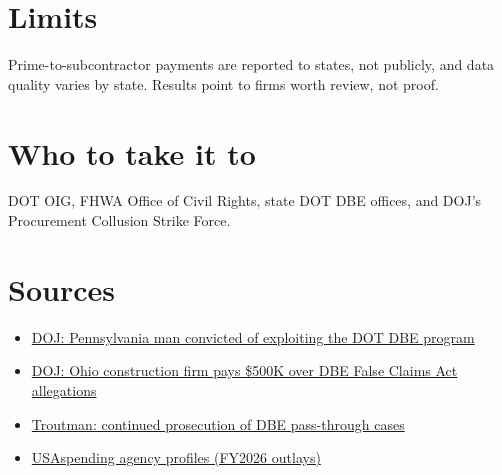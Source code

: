 \documentclass[letterpaper,11pt]{article}
\providecommand{\tightlist}{\setlength{\itemsep}{0pt}\setlength{\parskip}{0pt}}
\begin{document}
\hypertarget{limits}{%
\section{Limits}\label{limits}}

Prime-to-subcontractor payments are reported to states, not publicly,
and data quality varies by state. Results point to firms worth review,
not proof.

\hypertarget{who-to-take-it-to}{%
\section{Who to take it to}\label{who-to-take-it-to}}

DOT OIG, FHWA Office of Civil Rights, state DOT DBE offices, and DOJ's
Procurement Collusion Strike Force.

\hypertarget{sources}{%
\section{Sources}\label{sources}}

\begin{itemize}
\tightlist
\item
  \href{https://www.justice.gov/usao-edpa/pr/downingtown-man-convicted-exploiting-usdot-disadvantaged-business-program}{DOJ:
  Pennsylvania man convicted of exploiting the DOT DBE program}
\item
  \href{https://www.justice.gov/opa/pr/ohio-construction-firm-agrees-pay-500000-resolve-false-claims-act-allegations}{DOJ:
  Ohio construction firm pays \$500K over DBE False Claims Act
  allegations}
\item
  \href{https://www.troutman.com/insights/suppliers-beware-us-government-continues-prosecution-of-dbe-fraud-cases-involving-supplies-passed-through-dbes/}{Troutman:
  continued prosecution of DBE pass-through cases}
\item
  \href{https://www.usaspending.gov/agency}{USAspending agency profiles
  (FY2026 outlays)}
\end{itemize}
\end{document}
